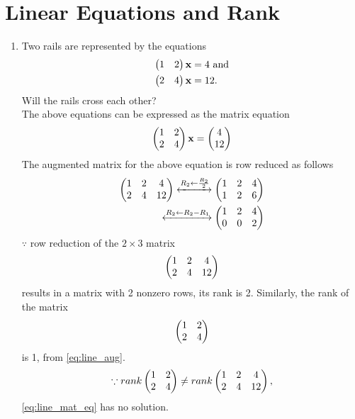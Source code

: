 \documentclass[journal,12pt,twocolumn]{IEEEtran}
\renewcommand\thesection{\arabic{section}}
\begin{document}
\section{Linear Equations and Rank}
\renewcommand{\theequation}{\theenumi}
\begin{enumerate}[label=\thesection.\arabic*.,ref=\thesection.\theenumi]
\item Two rails are represented by the equations 
\label{prob:line_mat_eq}
\begin{align}
\label{eq:line_mat_eq}
\begin{split}
\begin{pmatrix} 1 & 2\end{pmatrix}\mathbf{x}  &= 4 \text{ and}
\\
\begin{pmatrix}  2 & 4\end{pmatrix}\mathbf{x} &=  12 . 
\end{split}
\end{align}
%
Will the rails cross each other?
%
\\
\solution The above equations can be expressed as the matrix equation
\begin{align}
\begin{pmatrix} 1 & 2\\2 & 4\end{pmatrix} \mathbf{x} = \begin{pmatrix} 4\\12\end{pmatrix}
\end{align}
%
The augmented matrix for the above equation is row reduced as follows
\begin{align}
\begin{pmatrix} 1 & 2 & 4\\2 & 4 & 12\end{pmatrix} 
\xleftrightarrow {R_2\leftarrow \frac{R_2}{2}}\begin{pmatrix} 1 & 2 & 4\\1 & 2 & 6\end{pmatrix} 
\\
\xleftrightarrow {R_2\leftarrow R_2 - R_1}\begin{pmatrix} 1 & 2 & 4\\0 & 0 & 2\end{pmatrix} 
\label{eq:line_aug}
\end{align}
%
$\because$ row reduction of the $2\times 3$ matrix
%
\begin{align}
\begin{pmatrix} 1 & 2 & 4\\2 & 4 & 12\end{pmatrix} 
\end{align}
%
results in a matrix with 2 nonzero rows, its rank is 2.  Similarly, the rank of the matrix 
%
\begin{align}
\begin{pmatrix} 1 & 2\\2 & 4\end{pmatrix} 
\end{align}
is 1, from \ref{eq:line_aug}. 
%
\begin{align}
\because rank \begin{pmatrix} 1 & 2\\2 & 4\end{pmatrix} \ne rank\begin{pmatrix} 1 & 2 & 4\\2 & 4 & 12\end{pmatrix},  
\end{align}
%
\eqref{eq:line_mat_eq} has no solution.
%
%


\end{enumerate}
\end{document}
